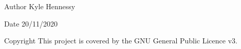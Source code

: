 \begin{DoxyAuthor}{Author}
Kyle Hennessy 
\end{DoxyAuthor}
\begin{DoxyDate}{Date}
20/11/2020 
\end{DoxyDate}
\begin{DoxyCopyright}{Copyright}
This project is covered by the G\+NU General Public Licence v3. 
\end{DoxyCopyright}
